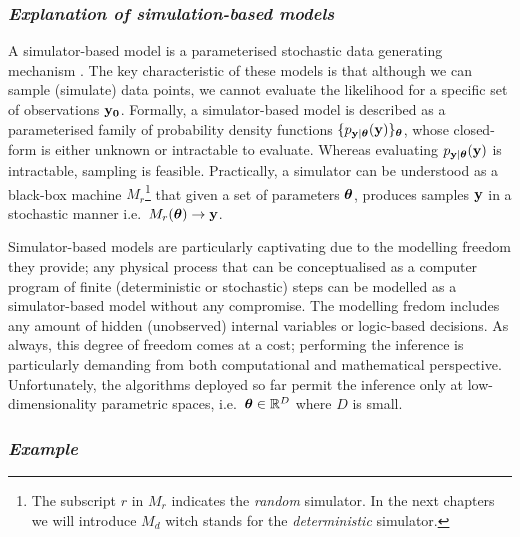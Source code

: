 \subsubsection*{\textit{Explanation of simulation-based models}}

A simulator-based model is a parameterised stochastic data generating
mechanism \autocite{Gutmann2016}. The key characteristic of these
models is that although we can sample (simulate) data points, we
cannot evaluate the likelihood for a specific set of observations
$\mathbf{y_0}$. Formally, a simulator-based model is described as a
parameterised family of probability density functions
$\{ p_{\mathbf{y}|\boldsymbol{\theta}}(\mathbf{y}) \}_{\boldsymbol{\theta}}$, whose closed-form is either
unknown or intractable to evaluate. Whereas evaluating
$p_{\mathbf{y}|\boldsymbol{\theta}}(\mathbf{y})$ is intractable, sampling is
feasible. Practically, a simulator can be understood as a black-box
machine $M_r$\footnote{The subscript $r$ in $M_r$ indicates the
  \textit{random} simulator. In the next chapters we will introduce
  $M_d$ witch stands for the \textit{deterministic} simulator.} that
given a set of parameters $\boldsymbol{\theta}$, produces samples $\mathbf{y}$ in a
stochastic manner i.e.\ $M_r(\boldsymbol{\theta}) \rightarrow \mathbf{y}$.

Simulator-based models are particularly captivating due to the
modelling freedom they provide; any physical process that can be
conceptualised as a computer program of finite (deterministic or
stochastic) steps can be modelled as a simulator-based model without
any compromise. The modelling fredom includes any amount of hidden
(unobserved) internal variables or logic-based decisions. As always,
this degree of freedom comes at a cost; performing the inference is
particularly demanding from both computational and mathematical
perspective. Unfortunately, the algorithms deployed so far permit the
inference only at low-dimensionality parametric spaces, i.e.\
$\boldsymbol{\theta} \in \mathbb{R}^D$ where $D$ is small.

\subsubsection*{\textit{Example}}

